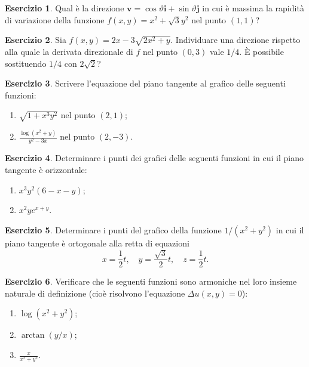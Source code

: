 \documentclass[12pt,a4paper]{article}
\theoremstyle{definition}
\newtheorem{exe}{Esercizio}
\begin{document}
\begin{exe}
    Qual è la direzione $\mathbf{v} = \cos \vartheta \mathbf{i} + \sin \vartheta \mathbf{j}$ in cui è massima la rapidità di variazione della funzione $f(x,y) = x^2 + \sqrt{3}y^2$ nel punto $(1,1)$?
\end{exe}

\begin{exe}
    Sia $f(x,y) = 2x - 3\sqrt{2x^2+y}$. Individuare una direzione rispetto alla quale la derivata direzionale di $f$ nel punto $(0,3)$ vale $1/4$. È possibile sostituendo $1/4$ con $2\sqrt{2}$?
\end{exe}

\begin{exe}
    Scrivere l'equazione del piano tangente al grafico delle seguenti funzioni:
    \begin{enumerate}
        \item $\sqrt{1+x^3y^2}$ nel punto $(2,1)$;
        \item $\frac{\log(x^2+y)}{y^2-3x}$ nel punto $(2,-3)$.
    \end{enumerate}
\end{exe}

\begin{exe}
    Determinare i punti dei grafici delle seguenti funzioni in cui il piano tangente è orizzontale:
    \begin{enumerate}
        \item $x^3 y^2 (6 - x - y)$;
        \item $x^2 y e^{x+y}$.
    \end{enumerate}
\end{exe}

\begin{exe}
    Determinare i punti del grafico della funzione $1/(x^2+y^2)$ in cui il piano tangente è ortogonale alla retta di equazioni
    \[ x = \frac{1}{2}t, \quad y = \frac{\sqrt{3}}{2}t, \quad z = \frac{1}{2}t. \]
\end{exe}

\begin{exe}
    Verificare che le seguenti funzioni sono armoniche nel loro insieme naturale di definizione (cioè risolvono l'equazione $\Delta u(x,y) = 0$):
    \begin{enumerate}
        \item $\log(x^2+y^2)$;
        \item $\arctan(y/x)$;
        \item $\frac{x}{x^2+y^2}$.
    \end{enumerate}
\end{exe}
\end{document}

